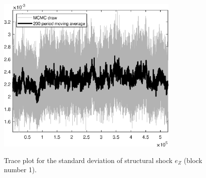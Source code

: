\begin{figure}[H]
\centering
  \includegraphics[width=0.8\textwidth]{BRS_growth_KPR/graphs/TracePlot_SE_e_Z_blck_1}\\
    \caption{Trace plot for the standard deviation of structural shock ${e_Z}$ (block number 1).}
\end{figure}
